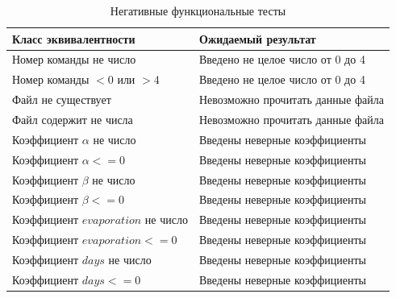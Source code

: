 \documentclass[a4paper,14pt, unknownkeysallowed]{extreport}
\begin{document}
\begin{table}[h]
    \captionsetup{justification=raggedright,singlelinecheck=off}
    \caption{\label{tbl:neg_test} Негативные функциональные тесты}
	\begin{center}
		\begin{tabular}{| l | l |}
			\hline
			Класс эквивалентности & Ожидаемый результат \\ \hline
   
            Номер команды не число & Введено не целое число от 0 до 4 \\\hline

            Номер команды $< 0$ или $> 4$ & Введено не целое число от 0 до 4 \\\hline

            Файл не существует & Невозможно прочитать данные файла  \\\hline

            Файл содержит не числа & Невозможно прочитать данные файла  \\\hline

            Коэффициент $\alpha$ не число & Введены неверные коэффициенты\\\hline
   
			Коэффициент $\alpha <= 0$ & Введены неверные коэффициенты\\\hline

            Коэффициент $\beta$ не число & Введены неверные коэффициенты\\\hline
   
			Коэффициент $\beta <= 0$ & Введены неверные коэффициенты\\\hline

            Коэффициент $evaporation$ не число & Введены неверные коэффициенты\\\hline
   
			Коэффициент $evaporation <= 0$ & Введены неверные коэффициенты\\\hline

            Коэффициент $days$ не число & Введены неверные коэффициенты\\\hline
   
			Коэффициент $days <= 0$ & Введены неверные коэффициенты\\\hline
   
		\end{tabular}
	\end{center}
	
\end{table}
\end{document}
